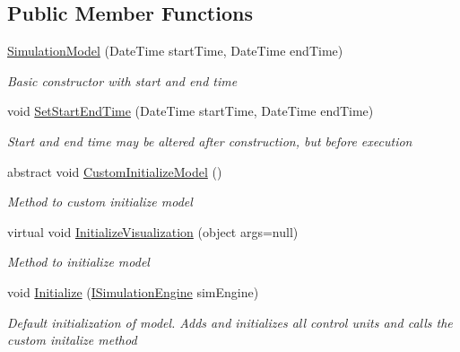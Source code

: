 \subsection*{Public Member Functions}
\begin{DoxyCompactItemize}
\item 
\hyperlink{class_simulation_core_1_1_simulation_classes_1_1_simulation_model_ad7bad2e61d59c3886d9db603e73cc754}{Simulation\+Model} (Date\+Time start\+Time, Date\+Time end\+Time)
\begin{DoxyCompactList}\small\item\em Basic constructor with start and end time \end{DoxyCompactList}\item 
void \hyperlink{class_simulation_core_1_1_simulation_classes_1_1_simulation_model_ae5e4518822e62dc469ca26e594c36da4}{Set\+Start\+End\+Time} (Date\+Time start\+Time, Date\+Time end\+Time)
\begin{DoxyCompactList}\small\item\em Start and end time may be altered after construction, but before execution \end{DoxyCompactList}\item 
abstract void \hyperlink{class_simulation_core_1_1_simulation_classes_1_1_simulation_model_ad9a40178ab5022d3ed8082dc59ec3bca}{Custom\+Initialize\+Model} ()
\begin{DoxyCompactList}\small\item\em Method to custom initialize model \end{DoxyCompactList}\item 
virtual void \hyperlink{class_simulation_core_1_1_simulation_classes_1_1_simulation_model_a1bd8af0ddc3822f959a59cc598537f28}{Initialize\+Visualization} (object args=null)
\begin{DoxyCompactList}\small\item\em Method to initialize model \end{DoxyCompactList}\item 
void \hyperlink{class_simulation_core_1_1_simulation_classes_1_1_simulation_model_ab7fb6a1762652f4d41466875eddf8029}{Initialize} (\hyperlink{interface_simulation_core_1_1_simulation_classes_1_1_i_simulation_engine}{I\+Simulation\+Engine} sim\+Engine)
\begin{DoxyCompactList}\small\item\em Default initialization of model. Adds and initializes all control units and calls the custom initalize method \end{DoxyCompactList}\item 

\end{DoxyCompactItemize}

